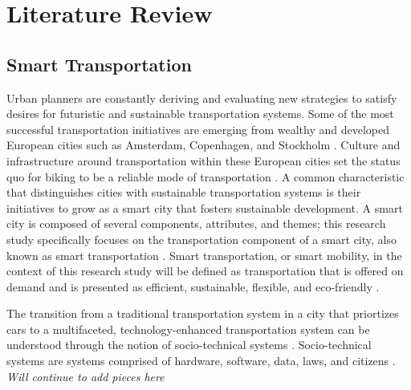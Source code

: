 \documentclass[12pt]{article}
\begin{document}

\section*{Literature Review}
\subsection*{Smart Transportation}
Urban planners are constantly deriving and evaluating new strategies to satisfy desires for futuristic and sustainable 
transportation systems. Some of the most successful transportation initiatives are emerging from wealthy and developed 
European cities such as Amsterdam, Copenhagen, and Stockholm \cite{DeliotteReport}. Culture and infrastructure around transportation 
within these European cities set the status quo for biking to be a reliable mode of transportation \cite{DeliotteReport}.  A common characteristic 
that distinguishes cities with sustainable transportation systems is their initiatives to grow as a smart city that 
fosters sustainable development. A smart city is composed of several components, attributes, and themes; this research study 
specifically focuses on the transportation component of a smart city, also known as smart transportation \cite{DefiningSmartCity}. 
Smart transportation, or smart mobility, in the context of this research study will be defined as transportation that is offered on demand
and is presented as efficient, sustainable, flexible, and eco-friendly \cite{SmartTransportation}. 

The transition from a traditional transportation system in a city that priortizes cars to a multifaceted, technology-enhanced transportation system
can be understood through the notion of socio-technical systems \cite{SmartTransportation}. Socio-technical systems are systems comprised of hardware, software,
data, laws, and citizens \cite{GeeksForGeeks}. 
\textit{Will continue to add pieces here} 
\end{document}
